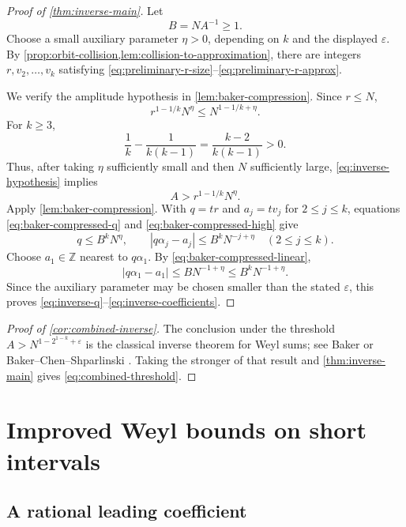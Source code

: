 \documentclass[11pt,reqno]{amsart}
\numberwithin{equation}{section}
\theoremstyle{definition}
\theoremstyle{remark}
\newcommand{\Z}{\mathbb Z}
\begin{document}
\begin{proof}[Proof of \cref{thm:inverse-main}]
Let
\[
  B=NA^{-1}\ge1.
\]
Choose a small auxiliary parameter $\eta>0$, depending on $k$ and the displayed $\varepsilon$.  By \cref{prop:orbit-collision,lem:collision-to-approximation}, there are integers $r,v_2,\ldots,v_k$ satisfying \eqref{eq:preliminary-r-size}--\eqref{eq:preliminary-r-approx}.

We verify the amplitude hypothesis in \cref{lem:baker-compression}.  Since $r\le N$,
\[
  r^{1-1/k}N^\eta
  \le N^{1-1/k+\eta}.
\]
For $k\ge3$,
\[
  \frac1k-\frac1{k(k-1)}
  =\frac{k-2}{k(k-1)}>0.
\]
Thus, after taking $\eta$ sufficiently small and then $N$ sufficiently large, \eqref{eq:inverse-hypothesis} implies
\[
  A>r^{1-1/k}N^\eta.
\]
Apply \cref{lem:baker-compression}.  With $q=tr$ and $a_j=tv_j$ for $2\le j\le k$, equations \eqref{eq:baker-compressed-q} and \eqref{eq:baker-compressed-high} give
\[
  q\le B^kN^\eta,
  \qquad
  |q\alpha_j-a_j|
  \le B^kN^{-j+\eta}
  \quad(2\le j\le k).
\]
Choose $a_1\in\Z$ nearest to $q\alpha_1$.  By \eqref{eq:baker-compressed-linear},
\[
  |q\alpha_1-a_1|
  \le BN^{-1+\eta}
  \le B^kN^{-1+\eta}.
\]
Since the auxiliary parameter may be chosen smaller than the stated $\varepsilon$, this proves \eqref{eq:inverse-q}--\eqref{eq:inverse-coefficients}.
\end{proof}

\begin{proof}[Proof of \cref{cor:combined-inverse}]
The conclusion under the threshold $A>N^{1-2^{1-k}+\varepsilon}$ is the classical inverse theorem for Weyl sums; see Baker \cite{Baker1982,Baker1992} or Baker--Chen--Shparlinski \cite[Lemma~2.6]{BakerChenShparlinski2024}.  Taking the stronger of that result and \cref{thm:inverse-main} gives \eqref{eq:combined-threshold}.
\end{proof}


\section{Improved Weyl bounds on short intervals}\label{sec:short-interval-bounds}

\subsection{A rational leading coefficient}
\end{document}
